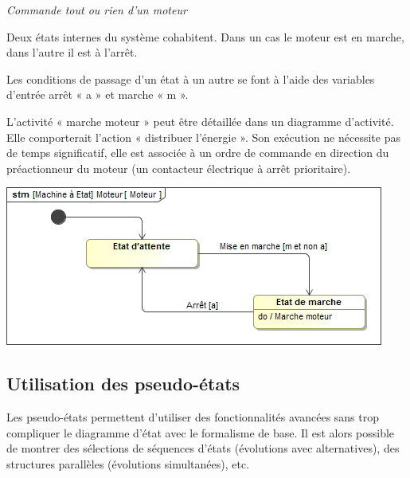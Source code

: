 \documentclass[10pt]{article}
\begin{document}
\begin{exemple}
\textit{Commande tout ou rien d'un moteur}

\begin{minipage}[c]{.48\linewidth}
Deux états internes du système cohabitent. Dans un cas le moteur est en marche, dans l’autre il est à l’arrêt.

Les conditions de passage d’un état à un autre se font à l’aide des variables d’entrée arrêt « a » et marche « m ».


L’activité « marche moteur » peut être détaillée dans un diagramme d’activité. Elle comporterait l’action « distribuer l’énergie ». Son exécution ne nécessite pas de temps significatif, elle est associée à un ordre de commande en direction du préactionneur du moteur (un contacteur électrique à arrêt prioritaire).
\end{minipage} \hfill
\begin{minipage}[c]{.48\linewidth}
\begin{center}
\includegraphics[width=\textwidth]{images/Moteur2}
\end{center}
\end{minipage}


\end{exemple}

\subsection{Utilisation des pseudo-états}


\begin{methode}
Les pseudo-états permettent d’utiliser des fonctionnalités avancées sans trop compliquer le diagramme d’état avec le formalisme de base.
Il est alors possible de montrer des sélections de séquences d’états (évolutions avec alternatives), des structures parallèles (évolutions simultanées), etc.
\end{methode}
\end{document}
